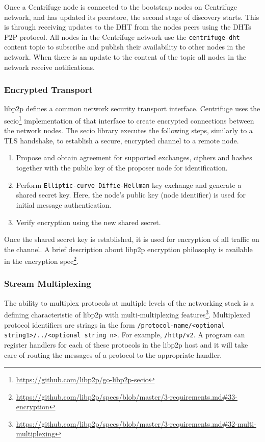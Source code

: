 Once a Centrifuge node is connected to the bootstrap nodes on Centrifuge network, and has updated its peerstore, the second stage of discovery starts. This is through receiving updates to the DHT from the nodes peers using the DHTs P2P protocol. All nodes in the Centrifuge network use the \texttt{centrifuge-dht} content topic to subscribe and publish their availability to other nodes in the network. When there is an update to the content of the topic all nodes in the network receive notifications.

\subsubsection{Encrypted Transport} \label{encrypted transport}
libp2p defines a common network security transport interface. Centrifuge uses the secio\footnote{\url{https://github.com/libp2p/go-libp2p-secio}} implementation of that interface to create encrypted connections between the network nodes. The secio library executes the following steps, similarly to a TLS handshake, to establish a secure, encrypted channel to a remote node. 
\begin{enumerate}
  \item Propose and obtain agreement for supported exchanges, ciphers and hashes together with the public key of the proposer node for identification.
  \item Perform \texttt{Elliptic-curve Diffie-Hellman} key exchange and generate a shared secret key. Here, the node's public key (node identifier) is used for initial message authentication.
  \item Verify encryption using the new shared secret.
\end{enumerate}

Once the shared secret key is established, it is used for encryption of all traffic on the channel. A brief description about libp2p encryption philosophy is available in the encryption spec\footnote{\url{https://github.com/libp2p/specs/blob/master/3-requirements.md\#33-encryption}}.

\subsubsection{Stream Multiplexing}

The ability to multiplex protocols at multiple levels of the networking stack is a defining characteristic of libp2p with multi-multiplexing features\footnote{\url{https://github.com/libp2p/specs/blob/master/3-requirements.md\#32-multi-multiplexing}}. Multiplexed protocol identifiers are strings in the form \texttt{/protocol-name/<optional string1>/../<optional string n>}. For example, \texttt{/http/v2}. A program can register handlers for each of these protocols in the libp2p host and it will take care of routing the messages of a protocol to the appropriate handler. 


